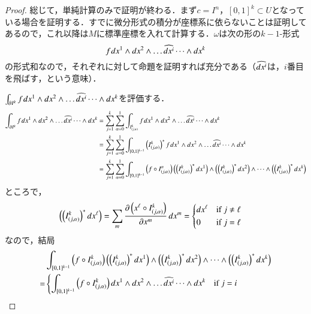 \begin{proof}
総じて，単純計算のみで証明が終わる．まず$c = I^n$，$[0,1]^k \subset U$となっている場合を証明する．すでに微分形式の積分が座標系に依らないことは証明してあるので，これ以降は$M$に標準座標を入れて計算する．$\omega$は次の形の$k-1$-形式
\begin{equation}
f_{} \mathop{}\!d x^1 \wedge \mathop{}\!d x^2 \wedge \dots \widehat{\mathop{}\!d x^i} \dots \wedge \mathop{}\!d x^k
\end{equation}の形式和なので，それぞれに対して命題を証明すれば充分である（$\widehat{\mathop{}\!d x^i}$は，$i$番目を飛ばす，という意味）．

$\int_{\partial I^k} f_{} \mathop{}\!d x^1 \wedge \mathop{}\!d x^2 \wedge \dots \widehat{\mathop{}\!d x^i} \dots \wedge \mathop{}\!d x^k$を評価する．
\begin{align}
\int_{\partial I^k} f_{} \dif x^1 \wedge \dif x^2 \wedge \dots \widehat{\dif x^i} \dots \wedge \dif x^k
&= \sum_{j = 1}^k \sum_{\alpha = 0}^1 \int_{I^k_{(j,\alpha)}} f_{} \dif x^1 \wedge \dif x^2 \wedge \dots \widehat{\dif x^i} \dots \wedge \dif x^k \\
&= \sum_{j = 1}^k \sum_{\alpha = 0}^1 \int_{[0,1]^{k-1}} \left(I^k_{(j,\alpha)}\right)^* f_{} \dif x^1 \wedge \dif x^2 \wedge \dots \widehat{\dif x^i} \dots \wedge \dif x^k \\
&= \sum_{j = 1}^k \sum_{\alpha = 0}^1 \int_{[0,1]^{k-1}} \left(f \circ I^n_{(j,\alpha)}\right) \left(\left(I^k_{(j,\alpha)}\right)^*\dif x^1\right) \wedge \left(\left(I^k_{(j,\alpha)}\right)^*\dif x^2\right) \wedge \dots \wedge \left(\left(I^k_{(j,\alpha)}\right)^*\dif x^k\right)  \\
\end{align}
ところで，
\begin{align}
\left(\left(I^k_{(j,\alpha)}\right)^*\dif x^\ell \right) &= \sum_m \frac{\partial \left(x^{\ell} \circ I^k_{(j, \alpha)}\right)}{\partial x^m} \dif x^m
=\begin{dcases*}
    \dif x^\ell & if $j\neq\ell$ \\
    0 & if $j = \ell$
  \end{dcases*}
\end{align}なので，結局
\begin{align}
&\int_{[0,1]^{k-1}} \left(f \circ I^k_{(j,\alpha)}\right) \left(\left(I^k_{(j,\alpha)}\right)^*\dif x^1\right) \wedge \left(\left(I^k_{(j,\alpha)}\right)^*\dif x^2\right) \wedge \dots \wedge \left(\left(I^k_{(j,\alpha)}\right)^*\dif x^k\right) \\
=& \begin{dcases*}
    \int_{[0,1]^{k-1}} \left(f \circ I^k_{(j,\alpha)}\right) \dif x^1 \wedge \dif x^2 \wedge \dots \widehat{\dif x^i} \dots \wedge \dif x^k & if $j = i$ \\

\end{dcases*}
\end{align}
\end{proof}
